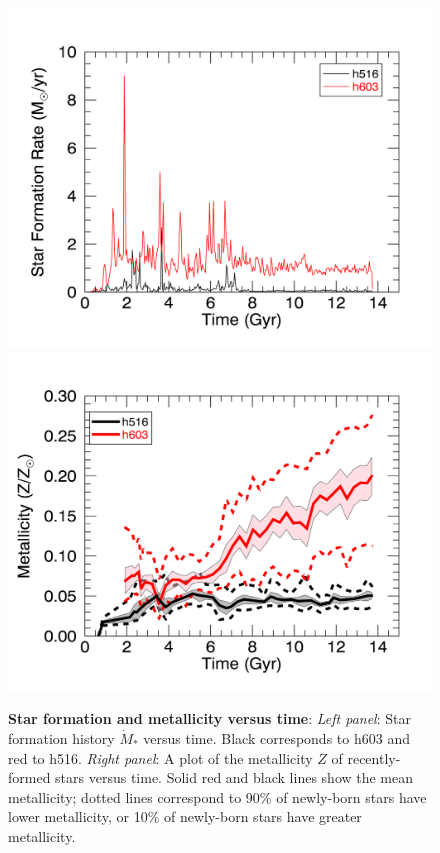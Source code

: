 \documentclass[nofootinbib,twocolumn,prd]{emulateapj}
\newcommand\unit[1]{\text{#1}}
\newcommand\ExcitingGalaxy{h258}
\newcommand\BoringGalaxy{h277}
\begin{document}
\begin{figure}
\includegraphics[width=\columnwidth]{Figures/sfh_dwarf}
\includegraphics[width=\columnwidth]{Figures/dwarf_zvst}
\caption{\label{fig:TwoDwarfGalaxies}\textbf{Star formation and metallicity versus time}:  \emph{Left panel}: Star formation history $\dot{M}_{*}$
  versus time.  Black corresponds to h603 and red to h516.  
\emph{Right panel}: A plot of the  metallicity $Z$ of recently-formed stars versus time.  Solid red and black lines show
the mean metallicity; dotted lines correspond to  90\% of newly-born stars have lower metallicity,   or 10\% of
newly-born stars have greater metallicity.  %
}
\end{figure}
\end{document}
